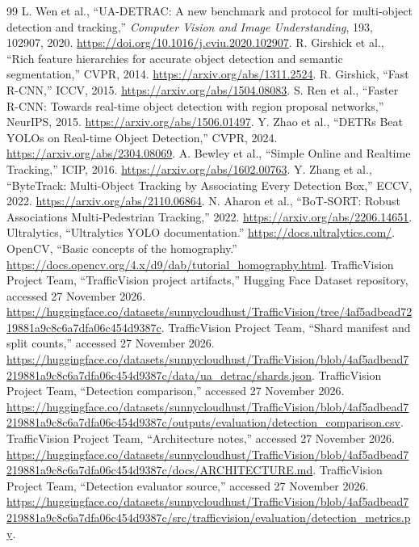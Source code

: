\begin{thebibliography}{99}
 L. Wen et al., ``UA-DETRAC: A new benchmark and protocol for multi-object detection and tracking,'' \emph{Computer Vision and Image Understanding}, 193, 102907, 2020. \url{https://doi.org/10.1016/j.cviu.2020.102907}.
 R. Girshick et al., ``Rich feature hierarchies for accurate object detection and semantic segmentation,'' CVPR, 2014. \url{https://arxiv.org/abs/1311.2524}.
 R. Girshick, ``Fast R-CNN,'' ICCV, 2015. \url{https://arxiv.org/abs/1504.08083}.
 S. Ren et al., ``Faster R-CNN: Towards real-time object detection with region proposal networks,'' NeurIPS, 2015. \url{https://arxiv.org/abs/1506.01497}.
 Y. Zhao et al., ``DETRs Beat YOLOs on Real-time Object Detection,'' CVPR, 2024. \url{https://arxiv.org/abs/2304.08069}.
 A. Bewley et al., ``Simple Online and Realtime Tracking,'' ICIP, 2016. \url{https://arxiv.org/abs/1602.00763}.
 Y. Zhang et al., ``ByteTrack: Multi-Object Tracking by Associating Every Detection Box,'' ECCV, 2022. \url{https://arxiv.org/abs/2110.06864}.
 N. Aharon et al., ``BoT-SORT: Robust Associations Multi-Pedestrian Tracking,'' 2022. \url{https://arxiv.org/abs/2206.14651}.
 Ultralytics, ``Ultralytics YOLO documentation.'' \url{https://docs.ultralytics.com/}.
 OpenCV, ``Basic concepts of the homography.'' \url{https://docs.opencv.org/4.x/d9/dab/tutorial_homography.html}.
 TrafficVision Project Team, ``TrafficVision project artifacts,'' Hugging Face Dataset repository, accessed 27 November 2026. \url{https://huggingface.co/datasets/sunnycloudhust/TrafficVision/tree/4af5adbead7219881a9c8c6a7dfa06c454d9387c}.
 TrafficVision Project Team, ``Shard manifest and split counts,'' accessed 27 November 2026. \url{https://huggingface.co/datasets/sunnycloudhust/TrafficVision/blob/4af5adbead7219881a9c8c6a7dfa06c454d9387c/data/ua_detrac/shards.json}.
 TrafficVision Project Team, ``Detection comparison,'' accessed 27 November 2026. \url{https://huggingface.co/datasets/sunnycloudhust/TrafficVision/blob/4af5adbead7219881a9c8c6a7dfa06c454d9387c/outputs/evaluation/detection_comparison.csv}.
 TrafficVision Project Team, ``Architecture notes,'' accessed 27 November 2026. \url{https://huggingface.co/datasets/sunnycloudhust/TrafficVision/blob/4af5adbead7219881a9c8c6a7dfa06c454d9387c/docs/ARCHITECTURE.md}.
 TrafficVision Project Team, ``Detection evaluator source,'' accessed 27 November 2026. \url{https://huggingface.co/datasets/sunnycloudhust/TrafficVision/blob/4af5adbead7219881a9c8c6a7dfa06c454d9387c/src/trafficvision/evaluation/detection_metrics.py}.

\end{thebibliography}
